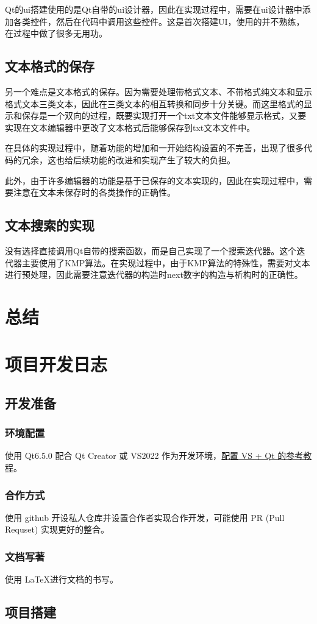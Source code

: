 \documentclass{./source/Report}
\begin{document}
Qt的ui搭建使用的是Qt自带的ui设计器，因此在实现过程中，需要在ui设计器中添加各类控件，然后在代码中调用这些控件。这是首次搭建UI，使用的并不熟练，在过程中做了很多无用功。

\subsection{文本格式的保存}
另一个难点是文本格式的保存。因为需要处理带格式文本、不带格式纯文本和显示格式文本三类文本，因此在三类文本的相互转换和同步十分关键。而这里格式的显示和保存是一个双向的过程，既要实现打开一个txt文本文件能够显示格式，又要实现在文本编辑器中更改了文本格式后能够保存到txt文本文件中。

在具体的实现过程中，随着功能的增加和一开始结构设置的不完善，出现了很多代码的冗余，这也给后续功能的改进和实现产生了较大的负担。

此外，由于许多编辑器的功能是基于已保存的文本实现的，因此在实现过程中，需要注意在文本未保存时的各类操作的正确性。

\subsection{文本搜索的实现}
没有选择直接调用Qt自带的搜索函数，而是自己实现了一个搜索迭代器。这个迭代器主要使用了KMP算法。在实现过程中，由于KMP算法的特殊性，需要对文本进行预处理，因此需要注意迭代器的构造时next数字的构造与析构时的正确性。


\section{总结}

\newpage
\appendix

\section{项目开发日志}
\subsection{开发准备}
\subsubsection{环境配置}
使用 Qt6.5.0 配合 Qt Creator 或 VS2022 作为开发环境，\href{https://blog.csdn.net/m0_62919535/article/details/129340079}{配置 VS + Qt 的参考教程}。

\subsubsection{合作方式}
使用 github 开设私人仓库并设置合作者实现合作开发，可能使用 PR (Pull Requset) 实现更好的整合。

\subsubsection{文档写著}
使用 \LaTeX 进行文档的书写。

\subsection{项目搭建}
\end{document}
